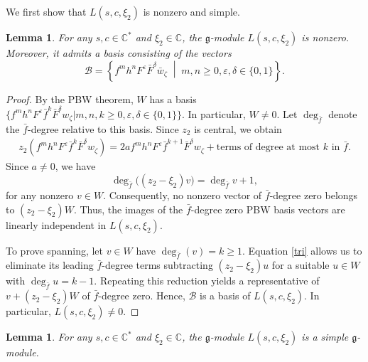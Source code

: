 \documentclass[a4paper,10pt]{article}
\theoremstyle{definition}
\theoremstyle{plain}
\newtheorem{lemma}[definition]{Lemma}
\theoremstyle{remark}
\theoremstyle{mystyle}
\numberwithin{equation}{section}
\begin{document}
We first show that $L(s,c,\xi_2)$ is nonzero and simple.
\begin{lemma}\label{Lbas}
    For any \(s,c\in\mathbb C^*\) and \(\xi_2\in\mathbb C\), the $\mathfrak g$-module \(L(s,c,\xi_2)\) is nonzero. Moreover, it admits a basis consisting of the vectors
\[
\mathcal B=\left\{
f^mh^nF^\varepsilon\bar F^\delta \bar w_{\zeta}
\;\middle|\;
m,n\ge0,
\varepsilon,\delta\in\{0,1\}
\right\}.
\]
\end{lemma}
\begin{proof}
    By the PBW theorem, $W$ has a basis $\{f^m h^n F^\varepsilon
    \bar f^k \bar F^\delta w_{\zeta}|m,n,k\geq 0,\varepsilon,\delta \in \{0,1\}\}$. In particular, $W\neq 0$. Let \(\deg_{\bar f}\) denote the \(\bar f\)-degree relative to this basis. Since \(z_2\) is central, we obtain
    \begin{eqnarray}\label{tri}
    z_2(f^m h^n F^\varepsilon\bar f^k\bar F^\delta w_{\zeta})=
    2a f^m h^n F^\varepsilon \bar f^{k+1}\bar F^\delta w_{\zeta}
    +\text{terms of degree at most }k
    \text{ in }\bar f.
    \end{eqnarray}
    Since \(a\neq0\), we have 
    \[
    \deg_{\bar f}\bigl((z_2-\xi_2)v\bigr)
    =
    \deg_{\bar f}v+1,
    \]
    for any nonzero $v\in W$. Consequently, no nonzero vector of \(\bar f\)-degree zero belongs to \((z_2-\xi_2)W\). Thus, the images of the $\bar f$-degree zero PBW basis vectors are linearly independent in \(L(s,c,\xi_2)\).

    To prove spanning, let $v\in W$ have $\deg_{\bar f}(v)=k\geq 1$. Equation \eqref{tri} allows us to eliminate its leading $\bar f$-degree terms subtracting \((z_2-\xi_2)u\) for a suitable \(u\in W\) with $\deg_{\bar f}u=k-1$. Repeating this reduction yields a representative of \(v+(z_2-\xi_2)W\) of $\bar f$-degree zero. 
    Hence, \(\mathcal B\) is a basis of \(L(s,c,\xi_2)\). In particular, $L(s,c,\xi_2)\neq0$.

    
\end{proof}
\begin{lemma}\label{sim2}
    For any $s,c\in \mathbb C^*$ and $\xi_2\in \mathbb C$, the $\mathfrak g$-module $L(s,c,\xi_2)$ is a simple $\mathfrak g$-module.
\end{lemma}
\end{document}
